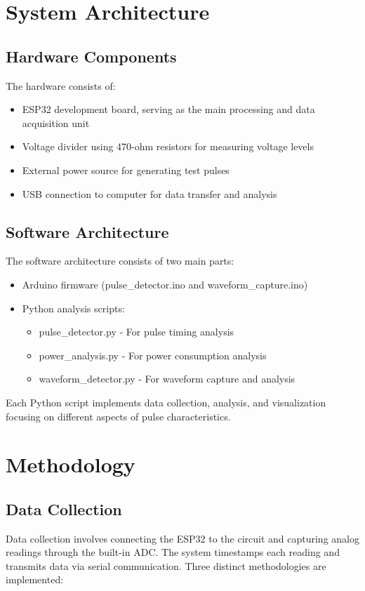 \documentclass[conference]{IEEEtran}
\begin{document}
\section{System Architecture}
\subsection{Hardware Components}
The hardware consists of:
\begin{itemize}
    \item ESP32 development board, serving as the main processing and data acquisition unit
    \item Voltage divider using 470-ohm resistors for measuring voltage levels
    \item External power source for generating test pulses
    \item USB connection to computer for data transfer and analysis
\end{itemize}

\subsection{Software Architecture}
The software architecture consists of two main parts:
\begin{itemize}
    \item Arduino firmware (pulse\_detector.ino and waveform\_capture.ino)
    \item Python analysis scripts:
    \begin{itemize}
        \item pulse\_detector.py - For pulse timing analysis
        \item power\_analysis.py - For power consumption analysis
        \item waveform\_detector.py - For waveform capture and analysis
    \end{itemize}
\end{itemize}

Each Python script implements data collection, analysis, and visualization focusing on different aspects of pulse characteristics.

\section{Methodology}
\subsection{Data Collection}
Data collection involves connecting the ESP32 to the circuit and capturing analog readings through the built-in ADC. The system timestamps each reading and transmits data via serial communication. Three distinct methodologies are implemented:
\end{document}
